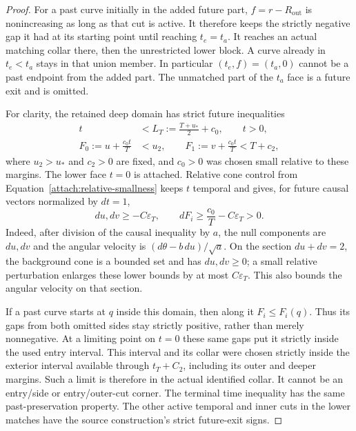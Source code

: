\begin{proof}
For a past curve initially in the added future part,
$f=r-R_{\mathrm{out}}$ is nonincreasing as long as that cut is
active. It therefore keeps the strictly negative gap it had at its
starting point until reaching $t_e=t_a$. It reaches an actual
matching collar there, then the unrestricted lower block. A curve
already in $t_e<t_a$ stays in that union member. In particular
$(t_e,f)=(t_a,0)$ cannot be a past endpoint from the added part.
The unmatched part of the $t_a$ face is a future exit and is omitted.

For clarity, the retained deep domain has strict future inequalities
\begin{equation}\label{attach:deep-domain}
 \begin{split}
 t&<L_T:=\frac{T+u_*}{2}+c_0,\qquad t>0,\\
 F_0:=u+\frac{c_0t}{T}&<u_2,
 \qquad F_1:=v+\frac{c_0t}{T}<T+c_2,
 \end{split}
\end{equation}
where $u_2>u_*$ and $c_2>0$ are fixed, and $c_0>0$ was chosen
small relative to these margins. The lower face $t=0$ is attached.
Relative cone control from Equation~\eqref{attach:relative-smallness}
keeps $t$ temporal and gives, for future causal vectors normalized
by $dt=1$,
\begin{equation}\label{attach:deep-sign}
 du,dv\ge-C\varepsilon_T,
 \qquad dF_i\ge \frac{c_0}{T}-C\varepsilon_T>0.
\end{equation}
Indeed, after division of the causal inequality by $a$, the null
components are $du,dv$ and the angular velocity is
$(d\theta-b\,du)/\sqrt a$. On the section $du+dv=2$, the
background cone is a bounded set and has $du,dv\ge0$;
a small relative perturbation enlarges these lower bounds by at
most $C\varepsilon_T$. This also bounds the angular velocity on
that section.

If a past curve starts at $q$ inside this domain, then along it
$F_i\le F_i(q)$. Thus its gaps from both omitted sides stay
strictly positive, rather than merely nonnegative. At a limiting
point on $t=0$ these same gaps put it strictly inside the used entry
interval. This interval and its collar were chosen strictly inside
the exterior interval available through $t_T+C_2$, including its
outer and deeper margins. Such a limit is therefore in the actual
identified collar. It cannot be an entry/side or entry/outer-cut
corner. The terminal time inequality has the same past-preservation
property. The other active temporal and inner cuts in the lower
matches have the source construction's strict future-exit signs.


\end{proof}
